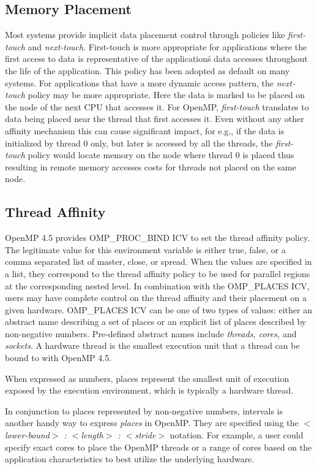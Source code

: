 \subsection{Memory Placement}
Most systems provide implicit data placement control through policies like \textit{first-touch} 
and \textit{next-touch}. First-touch is more appropriate for applications where the 
first access to data is representative of the application\'s data accesses throughout 
the life of the application. This policy has been adopted as default on many systems. 
For applications that have a more dynamic access pattern, the \textit{next-touch} 
policy may be more appropriate. Here the data is marked to be placed on the node of the 
next CPU that accesses it. For OpenMP, \textit{first-touch} translates to data being 
placed near the thread that first accesses it. Even without any other affinity mechanism this 
can cause significant impact, for e.g., if the data is initialized by thread 0 only, but later is accessed 
by all the threads, the \textit{first-touch} policy would locate memory on the node where 
thread 0 is placed thus resulting in remote memory accesses costs for threads not placed on the same node. 

\subsection{Thread Affinity}
OpenMP 4.5 provides OMP\_PROC\_BIND ICV to set the thread affinity policy. The legitimate value for 
this environment variable is either true, false, or a comma separated list of master, close, or spread. 
When the values are specified in a list, they correspond to the thread affinity policy to be used for 
parallel regions at the corresponding nested level. In combination with the OMP\_PLACES ICV, 
users may have complete control on the thread affinity and their placement on a given hardware. 
OMP\_PLACES ICV can be one of two types of values: either an abstract name describing a set 
of places or an explicit list of places described by non-negative numbers. Pre-defined abstract 
names include \textit{threads, cores,} and \textit{sockets}. A hardware thread is the smallest execution 
unit that a thread can be bound to with OpenMP 4.5. 


When expressed as numbers, places 
represent the smallest unit of execution exposed by the execution environment, which is typically 
a hardware thread.

In conjunction to places represented by non-negative numbers, intervals is another handy way to 
express \textit{places} in OpenMP. They are specified using the \textit{$<$lower-bound$>$ : $<$length$>$ : $<$stride$>$} notation. For example, a user could specify exact cores to place the OpenMP threads or a range of cores based on the application characteristics to best utilize the underlying hardware.

